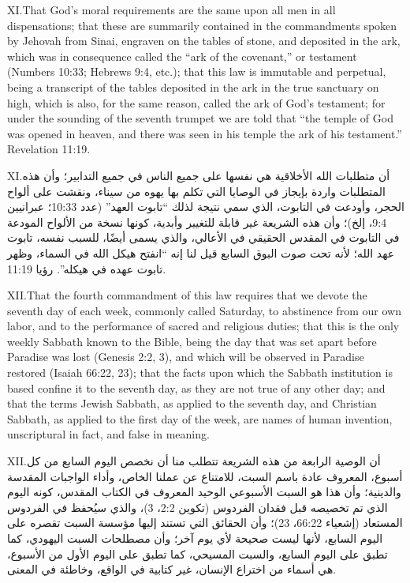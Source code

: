 \lettrine{XI.} That God’s moral requirements are the same upon all men in all dispensations; that these are summarily contained in the commandments spoken by Jehovah from Sinai, engraven on the tables of stone, and deposited in the ark, which was in consequence called the “ark of the covenant,” or testament (Numbers 10:33; Hebrews 9:4, etc.); that this law is immutable and perpetual, being a transcript of the tables deposited in the ark in the true sanctuary on high, which is also, for the same reason, called the ark of God’s testament; for under the sounding of the seventh trumpet we are told that “the temple of God was opened in heaven, and there was seen in his temple the ark of his testament.” Revelation 11:19.


\lettrine{XI.} أن متطلبات الله الأخلاقية هي نفسها على جميع الناس في جميع التدابير؛ وأن هذه المتطلبات واردة بإيجاز في الوصايا التي تكلم بها يهوه من سيناء، ونقشت على ألواح الحجر، وأودعت في التابوت، الذي سمي نتيجة لذلك “تابوت العهد” (عدد 10:33؛ عبرانيين 9:4، إلخ)؛ وأن هذه الشريعة غير قابلة للتغيير وأبدية، كونها نسخة من الألواح المودعة في التابوت في المقدس الحقيقي في الأعالي، والذي يسمى أيضًا، للسبب نفسه، تابوت عهد الله؛ لأنه تحت صوت البوق السابع قيل لنا إنه “انفتح هيكل الله في السماء، وظهر تابوت عهده في هيكله”. رؤيا 11:19.


\lettrine{XII.} That the fourth commandment of this law requires that we devote the seventh day of each week, commonly called Saturday, to abstinence from our own labor, and to the performance of sacred and religious duties; that this is the only weekly Sabbath known to the Bible, being the day that was set apart before Paradise was lost (Genesis 2:2, 3), and which will be observed in Paradise restored (Isaiah 66:22, 23); that the facts upon which the Sabbath institution is based confine it to the seventh day, as they are not true of any other day; and that the terms Jewish Sabbath, as applied to the seventh day, and Christian Sabbath, as applied to the first day of the week, are names of human invention, unscriptural in fact, and false in meaning.


\lettrine{XII.} أن الوصية الرابعة من هذه الشريعة تتطلب منا أن نخصص اليوم السابع من كل أسبوع، المعروف عادة باسم السبت، للامتناع عن عملنا الخاص، وأداء الواجبات المقدسة والدينية؛ وأن هذا هو السبت الأسبوعي الوحيد المعروف في الكتاب المقدس، كونه اليوم الذي تم تخصيصه قبل فقدان الفردوس (تكوين 2:2، 3)، والذي سيُحفظ في الفردوس المستعاد (إشعياء 66:22، 23)؛ وأن الحقائق التي تستند إليها مؤسسة السبت تقصره على اليوم السابع، لأنها ليست صحيحة لأي يوم آخر؛ وأن مصطلحات السبت اليهودي، كما تطبق على اليوم السابع، والسبت المسيحي، كما تطبق على اليوم الأول من الأسبوع، هي أسماء من اختراع الإنسان، غير كتابية في الواقع، وخاطئة في المعنى.


